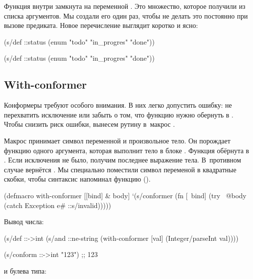 Функция внутри замкнута на переменной . Это множество, которое
получили из списка аргументов. Мы создали его один раз, чтобы не делать это
постоянно при вызове предиката. Новое перечисление выглядит коротко и ясно:

\ifafive

\begin{clojure}
(s/def ::status
  (enum "todo" "in_progres" "done"))
\end{clojure}

\else

\begin{clojure}
(s/def ::status
  (enum "todo"
        "in_progres"
        "done"))
\end{clojure}

\fi

\subsection{With-conformer}


Конформеры требуют особого внимания. В них легко допустить ошибку: не
перехватить исключение или забыть о том, что функцию нужно обернуть в
. Чтобы снизить риск ошибки, вынесем рутину в~макрос
.

Макрос принимает символ переменной и произвольное тело. Он порождает функцию
одного аргумента, которая выполнит тело в блоке . Функция
обёрнута в . Если исключения не было, получим последнее
выражение тела. В~противном случае вернётся . Мы специально
поместили символ переменой в квадратные скобки, чтобы синтаксис напоминал
функцию ().

\begin{clojure}
(defmacro with-conformer
  [[bind] & body]
  `(s/conformer
    (fn [~bind]
      (try
        ~@body
        (catch Exception e#
          ::s/invalid)))))
\end{clojure}

Вывод числа:

\begin{clojure}
(s/def ::->int
  (s/and
    ::ne-string
    (with-conformer [val]
      (Integer/parseInt val))))

(s/conform ::->int "123")
;; 123
\end{clojure}

\noindent
и булева типа:


